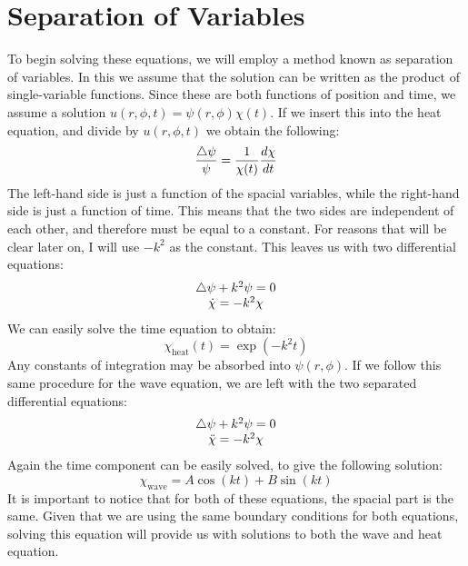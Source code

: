 \documentclass{article}
\begin{document}
\section{Separation of Variables}
To begin solving these equations, we will employ a method known as separation of variables. In this we assume that the solution can be written as the product of single-variable functions. Since these are both functions of position and time, we assume a solution $u(r,\phi,t)=\psi(r,\phi)\chi(t)$. If we insert this into the heat equation, and divide by $u(r,\phi,t)$ we obtain the following:
\begin{equation}
  \frac{\bigtriangleup \psi}{\psi} = \frac{1}{\chi(t)}\frac{d \chi}{d t}
\end{equation}
The left-hand side is just a function of the spacial variables, while the right-hand side is just a function of time. This means that the two sides are independent of each other, and therefore must be equal to a constant. For reasons that will be clear later on, I will use $-k^2$ as the constant. This leaves us with two differential equations:
\begin{equation}
  \begin{matrix}
    \bigtriangleup\psi+k^2\psi=0\\
    \dot{\chi}=-k^2 \chi
  \end{matrix}
\end{equation}
We can easily solve the time equation to obtain:
\begin{equation}
  \chi_{\mathrm{heat}}(t)=\exp(-k^2 t)
\end{equation}
Any constants of integration may be absorbed into $\psi(r,\phi)$. If we follow this same procedure for the wave equation, we are left with the two separated differential equations:
\begin{equation}
  \begin{matrix}
    \bigtriangleup\psi+k^2\psi=0\\
    \ddot{\chi}=-k^2 \chi
  \end{matrix}
\end{equation}
Again the time component can be easily solved, to give the following solution:
\begin{equation}
  \chi_{\mathrm{wave}}=A\cos(kt)+B\sin(kt)
\end{equation}
It is important to notice that for both of these equations, the spacial part is the same. Given that we are using the same boundary conditions for both equations, solving this equation will provide us with solutions to both the wave and heat equation.
\end{document}
